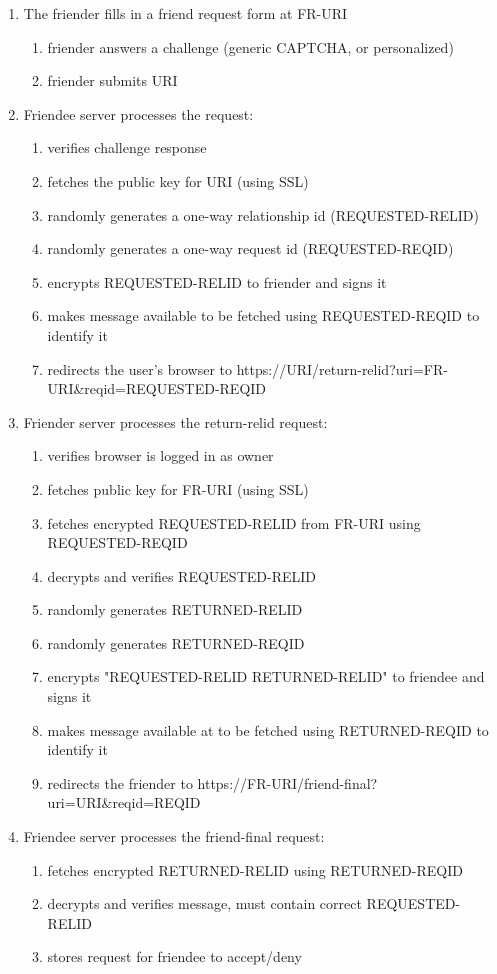 \documentclass[letterpaper,11pt,oneside]{article}
\begin{document}
\begin{enumerate}
\item The friender fills in a friend request form at FR-URI
	\begin{enumerate}
	\item friender answers a challenge (generic CAPTCHA, or personalized)
	\item friender submits URI
	\end{enumerate}

\item Friendee server processes the request:
	\begin{enumerate}
	\item verifies challenge response
	\item fetches the public key for URI (using SSL)
	\item randomly generates a one-way relationship id (REQUESTED-RELID)
	\item randomly generates a one-way request id (REQUESTED-REQID)
	\item encrypts REQUESTED-RELID to friender and signs it
	\item makes message available to be fetched using REQUESTED-REQID to identify it
	\item redirects the user's browser to https://URI/return-relid?uri=FR-URI\&reqid=REQUESTED-REQID
	\end{enumerate}

\item Friender server processes the return-relid request:
	\begin{enumerate}
	\item verifies browser is logged in as owner
	\item fetches public key for FR-URI (using SSL)
	\item fetches encrypted REQUESTED-RELID from FR-URI using REQUESTED-REQID
	\item decrypts and verifies REQUESTED-RELID
	\item randomly generates RETURNED-RELID
	\item randomly generates RETURNED-REQID
	\item encrypts "REQUESTED-RELID RETURNED-RELID" to friendee and signs it
	\item makes message available at to be fetched using RETURNED-REQID to identify it
	\item redirects the friender to https://FR-URI/friend-final?uri=URI\&reqid=REQID
	\end{enumerate}

\item Friendee server processes the friend-final request:
	\begin{enumerate}
	\item fetches encrypted RETURNED-RELID using RETURNED-REQID
	\item decrypts and verifies message, must contain correct REQUESTED-RELID
	\item stores request for friendee to accept/deny
	\end{enumerate}
\end{enumerate}
\end{document}
